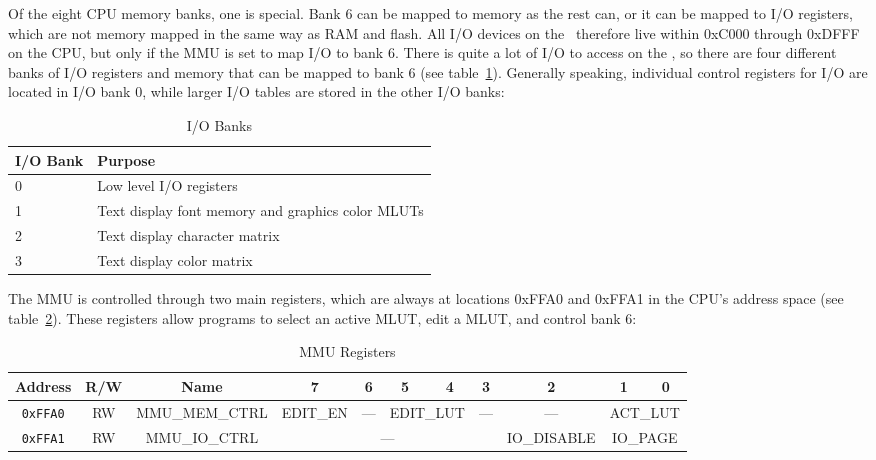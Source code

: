 Of the eight CPU memory banks, one is special. Bank 6 can be mapped to memory as the rest can, or it can be mapped to I/O registers, which are not memory mapped in the same way as RAM and flash. All I/O devices on the \jr\ therefore live within 0xC000 through 0xDFFF on the CPU, but only if the MMU is set to map I/O to bank 6. There is quite a lot of I/O to access on the \jr, so there are four different banks of I/O registers and memory that can be mapped to bank 6 (see table~\ref{tab:io_banks}). Generally speaking, individual control registers for I/O are located in I/O bank 0, while larger I/O tables are stored in the other I/O banks:

\begin{table}[ht]
	\begin{center}
		\begin{tabular}{| l | l |} \hline
			I/O Bank & Purpose \\ \hline\hline
			0 & Low level I/O registers \\ \hline
			1 & Text display font memory and graphics color MLUTs \\ \hline
			2 & Text display character matrix \\ \hline
			3 & Text display color matrix \\ \hline
		\end{tabular}
	\end{center}
	\caption{I/O Banks}
	\label{tab:io_banks}
\end{table}

The MMU is controlled through two main registers, which are always at locations 0xFFA0 and 0xFFA1 in the CPU's address space (see table~\ref{tab:mmu_registers}). These registers allow programs to select an active MLUT, edit a MLUT, and control bank 6:

\begin{table}[ht]
	\begin{center}
		\begin{tabular}{| c | c | c || c | c | c | c | c | c | c | c |} \hline
			Address & R/W & Name & 7 & 6 & 5 & 4 & 3 & 2 & 1 & 0 \\ \hline\hline
			\verb+0xFFA0+ & RW & MMU\_MEM\_CTRL & EDIT\_EN & --- & \multicolumn{2}{|c|}{EDIT\_LUT} & --- & --- & \multicolumn{2}{|c|}{ACT\_LUT} \\ \hline
			\verb+0xFFA1+ & RW & MMU\_IO\_CTRL & \multicolumn{5}{|c|}{---} & IO\_DISABLE & \multicolumn{2}{|c|}{IO\_PAGE} \\ \hline
		\end{tabular}
	\end{center}
	\caption{MMU Registers}
	\label{tab:mmu_registers}
\end{table}

